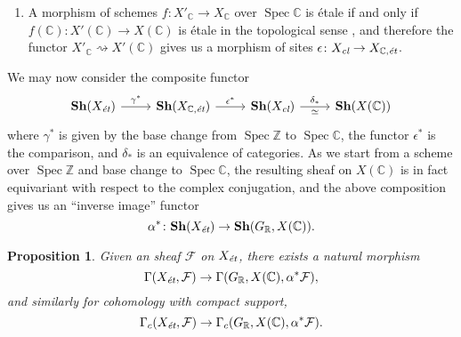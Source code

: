 \documentclass{article}
\DeclareMathOperator{\Spec}{Spec}
\newcommand{\CC}{\mathbb{C}}
\newcommand{\RR}{\mathbb{R}}
\newcommand{\ZZ}{\mathbb{Z}}
\newcommand{\et}{\text{\it ét}}
\newtheorem{proposition}[theorem]{Proposition}
\theoremstyle{definition}
\numberwithin{equation}{section}
\begin{document}
\begin{appendices}
\begin{enumerate}
  Let $X_\text{\it cl}$\footnote{``cl'' for ``classique''.} be the site of étale
  maps $f\colon U\to X (\CC)$. A covering family in $X_\text{\it cl}$ is a
  family of maps $\{ U_i \to U \}$ such that $U$ is the union of images of
  $U_i$.

  As the inclusion of an open subset $U \subset X (\CC)$ is trivially an étale
  map, we have a fully faithful functor $X (\CC) \subset X_\text{\it cl}$, and
  the topology on $X (\CC)$ is induced by the topology on
  $X_\text{\it cl}$. This gives us a morphism of sites
  $\delta\colon X_\text{\it cl} \to X (\CC)$,
  which by the well-known ``comparison lemma''
  \cite[Exposé~III, Théorème~4.1]{SGA4} induces an equivalence of the
  corresponding categories of sheaves
  $\delta_*\colon \mathbf{Sh} (X_\text{\it cl}) \to \mathbf{Sh} (X (\CC))$.

\item A morphism of schemes $f\colon X'_\CC \to X_\CC$ over $\Spec \CC$ is étale
  if and only if $f (\CC)\colon X' (\CC) \to X (\CC)$ is étale in the
  topological sense \cite[Exposé~XII, Proposition~3.1]{SGA1}, and therefore the
  functor $X'_\CC \rightsquigarrow X' (\CC)$ gives us a morphism of sites
  $\epsilon\colon X_\text{\it cl} \to X_{\CC,\text{\it ét}}$.
\end{enumerate}

We may now consider the composite functor
\[ \begin{tikzcd}
  \mathbf{Sh} (X_\et) \ar{r}{\gamma^*} &
  \mathbf{Sh} (X_{\CC,\text{\it ét}}) \ar{r}{\epsilon^*} &
  \mathbf{Sh} (X_\text{\it cl}) \ar{r}{\delta_*}[swap]{\simeq} &
  \mathbf{Sh} (X (\CC))
\end{tikzcd} \]
where $\gamma^*$ is given by the base change from $\Spec \ZZ$ to $\Spec \CC$,
the functor $\epsilon^*$ is the comparison, and $\delta_*$ is an equivalence of
categories. As we start from a scheme over $\Spec \ZZ$ and base change to
$\Spec \CC$, the resulting sheaf on $X (\CC)$ is in fact equivariant with
respect to the complex conjugation, and the above composition gives us an
``inverse image'' functor
$$\alpha^*\colon \mathbf{Sh} (X_\et) \to \mathbf{Sh} (G_\RR, X (\CC)).$$

\begin{proposition}
  \label{prop:inverse-image-gamma}
  Given an sheaf $\mathcal{F}$ on $X_\et$, there exists a natural morphism
  $$\Gamma (X_\et, \mathcal{F}) \to \Gamma (G_\RR, X (\CC), \alpha^* \mathcal{F}),$$
  and similarly for cohomology with compact support,
  $$\Gamma_c (X_\et, \mathcal{F}) \to \Gamma_c (G_\RR, X (\CC), \alpha^* \mathcal{F}).$$


\end{proposition}
\end{appendices}
\end{document}
